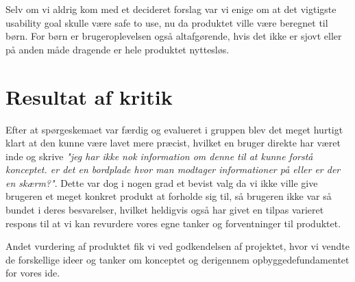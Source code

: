 \documentclass{article}
\begin{document}
    Selv om vi aldrig kom med et decideret forslag var vi enige om at det vigtigste usability goal skulle være safe to use, nu da produktet ville være beregnet til børn. For børn er brugeroplevelsen også altafgørende, hvis det ikke er sjovt eller på anden måde dragende er hele produktet nyttesløs.
    
\section{Resultat af kritik}
	Efter at spørgeskemaet var færdig og evalueret i gruppen blev det meget hurtigt klart at den kunne være lavet mere præcist, hvilket en bruger direkte har været inde og skrive \emph{"jeg har ikke nok information om denne til at kunne forstå konceptet. er det en bordplade hvor man modtager informationer på eller er der en skærm?"}. Dette var dog i nogen grad et bevist valg da vi ikke ville give brugeren et meget konkret produkt at forholde sig til, så brugeren ikke var så bundet i deres besvarelser, hvilket heldigvis også har givet en tilpas varieret respons til at vi kan revurdere vores egne tanker og forventninger til produktet.
	
	Andet vurdering af produktet fik vi ved godkendelsen af projektet, hvor vi vendte de forskellige ideer og tanker om konceptet og derigennem opbyggedefundamentet for vores ide.
\end{document}
